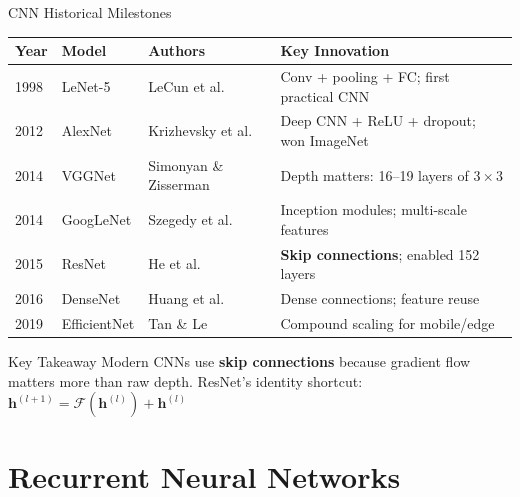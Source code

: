 \documentclass[aspectratio=169]{beamer}
\begin{document}
\begin{frame}{CNN Historical Milestones}

\begin{tabular}{@{}lllp{5cm}@{}}
\toprule
\textbf{Year} & \textbf{Model} & \textbf{Authors} & \textbf{Key Innovation} \\
\midrule
1998 & LeNet-5 & LeCun et al. & Conv + pooling + FC; first practical CNN \\
2012 & AlexNet & Krizhevsky et al. & Deep CNN + ReLU + dropout; won ImageNet \\
2014 & VGGNet & Simonyan \& Zisserman & Depth matters: 16--19 layers of $3{\times}3$ \\
2014 & GoogLeNet & Szegedy et al. & Inception modules; multi-scale features \\
2015 & ResNet & He et al. & \textbf{Skip connections}; enabled 152 layers \\
2016 & DenseNet & Huang et al. & Dense connections; feature reuse \\
2019 & EfficientNet & Tan \& Le & Compound scaling for mobile/edge \\
\bottomrule
\end{tabular}

\vspace{0.4cm}
\begin{block}{Key Takeaway}
Modern CNNs use \textbf{skip connections} because gradient flow matters more than raw depth. ResNet's identity shortcut: $\mathbf{h}^{(l+1)} = \mathcal{F}(\mathbf{h}^{(l)}) + \mathbf{h}^{(l)}$
\end{block}
\end{frame}

\section{Recurrent Neural Networks}
\end{document}
